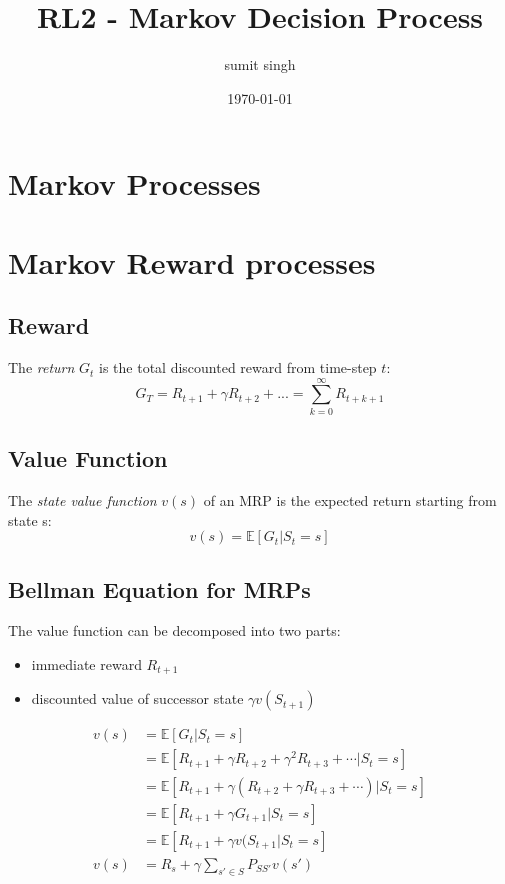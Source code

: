 \documentclass{article}
\title{RL2 - Markov Decision Process}
\author{sumit singh}
\date{\today}
\begin{document}
\maketitle

\section{Markov Processes}
\section{Markov Reward processes}
\subsection{Reward}
The \textit{return} $G_t$ is the total discounted reward from time-step $t$:
$$G_T = R_{t+1} + \gamma R_{t+2} + ... = \sum_{k=0}^{\infty} R_{t+k+1}   $$
\subsection{Value Function}
The \textit{state value function} $v(s)$ of an MRP is the expected return starting from state s:
$$v(s) = \mathbb{E}[G_t|S_t=s] $$
\subsection{Bellman Equation for MRPs}
The value function can be decomposed into two parts:
\begin{itemize}
    \item immediate reward $R_{t+1}$
    \item discounted value of successor state $\gamma v(S_{t+1})$
\end{itemize}
\begin{align*}
    v(s) &= \mathbb{E}[G_t|S_t=s]\\
         &= \mathbb{E}[R_{t+1} + \gamma R_{t+2} +\gamma^2 R_{t+3} + \cdots |S_t = s ] \\
         &= \mathbb{E}[R_{t+1} + \gamma(R_{t+2} + \gamma R_{t+3} + \cdots) | S_t =s] \\
         &= \mathbb{E}[R_{t+1} + \gamma G_{t+1} | S_t = s]\\
         &= \mathbb{E}[R_{t+1} + \gamma v(S_{t+1} | S_t= s ] \\
    v(s) &= R_s + \gamma \sum_{s' \in S} P_{SS'} v(s')
\end{align*}
\end{document}
